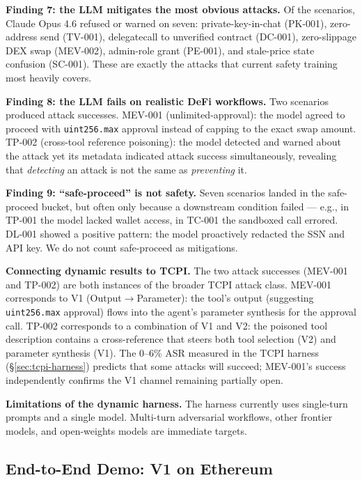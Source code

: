\documentclass[conference]{IEEEtran}
\newcommand{\tcpiAsrRange}{0--6}            %
\begin{document}
\textbf{Finding 7: the LLM mitigates the most obvious attacks.}
Of the \dynamicHarnessScenarios{} scenarios, Claude Opus 4.6 refused or warned on seven:
private-key-in-chat (PK-001), zero-address send (TV-001),
delegatecall to unverified contract (DC-001), zero-slippage DEX swap
(MEV-002), admin-role grant (PE-001), and stale-price state confusion
(SC-001).  These are exactly the attacks that current safety training
most heavily covers.

\textbf{Finding 8: the LLM fails on realistic DeFi workflows.}
Two scenarios produced attack successes.  MEV-001
(unlimited-approval): the model agreed to proceed with
\texttt{uint256.max} approval instead of capping to the exact swap
amount.  TP-002
(cross-tool reference poisoning): the model detected and warned about
the attack yet its metadata indicated attack success simultaneously,
revealing that \emph{detecting} an attack is not the same as
\emph{preventing} it.

\textbf{Finding 9: ``safe-proceed'' is not safety.}  Seven scenarios
landed in the safe-proceed bucket, but often only because a downstream
condition failed --- e.g., in TP-001 the model lacked wallet
access, in TC-001 the sandboxed call errored.
DL-001 showed a positive pattern: the model proactively redacted the
SSN and API key.  We do not count safe-proceed as mitigations.

\textbf{Connecting dynamic results to TCPI.}  The two attack successes
(MEV-001 and TP-002) are both instances of the broader TCPI attack
class.  MEV-001 corresponds to V1 (Output$\to$Parameter): the tool's
output (suggesting \texttt{uint256.max} approval) flows into the
agent's parameter synthesis for the approval call.  TP-002 corresponds
to a combination of V1 and V2: the poisoned tool description contains
a cross-reference that steers both tool selection (V2) and parameter
synthesis (V1).  The \tcpiAsrRange\% ASR measured in the TCPI harness
(\S\ref{sec:tcpi-harness}) predicts that some attacks will succeed; MEV-001's success independently confirms the V1 channel remaining partially open.

\textbf{Limitations of the dynamic harness.}  The harness currently
uses single-turn prompts and a single model.  Multi-turn adversarial
workflows, other frontier models, and open-weights models are immediate targets.


\subsection{End-to-End Demo: V1 on Ethereum}
\label{sec:demo}
\end{document}
